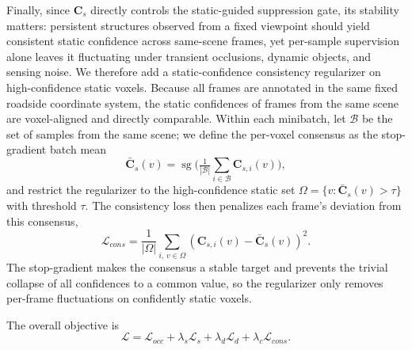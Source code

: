 Finally, since $\bm{C}_{s}$ directly controls the static-guided suppression
gate, its stability matters: persistent structures observed from a fixed
viewpoint should yield consistent static confidence across same-scene frames,
yet per-sample supervision alone leaves it fluctuating under transient
occlusions, dynamic objects, and sensing noise. We therefore add a
static-confidence consistency regularizer on high-confidence static voxels.
Because all frames are annotated in the same fixed roadside coordinate
system, the static confidences of frames from the same scene are voxel-aligned
and directly comparable. Within each minibatch, let $\mathcal{B}$ be the set of
samples from the same scene; we define the per-voxel consensus as the
stop-gradient batch mean
\begin{equation}
  \bar{\bm{C}}_{s}(v)
  =
  \operatorname{sg}\!\Big(
  \tfrac{1}{|\mathcal{B}|}\textstyle\sum_{i\in\mathcal{B}}\bm{C}_{s,i}(v)
  \Big),
\end{equation}
and restrict the regularizer to the high-confidence static set
$\Omega=\{v:\bar{\bm{C}}_{s}(v)>\tau\}$ with threshold $\tau$. The consistency
loss then penalizes each frame's deviation from this consensus,
\begin{equation}
  \mathcal{L}_{cons}
  =
  \frac{1}{|\Omega|}
  \sum_{i,\,v\in\Omega}
  \left(
  \bm{C}_{s,i}(v)-\bar{\bm{C}}_{s}(v)
  \right)^2 .
\end{equation}
The stop-gradient makes the consensus a stable target and prevents the
trivial collapse of all confidences to a common value, so the regularizer only
removes per-frame fluctuations on confidently static voxels.

The overall objective is
\begin{equation}
  \mathcal{L}
  =
  \mathcal{L}_{occ}
  +
  \lambda_s\mathcal{L}_{s}
  +
  \lambda_d\mathcal{L}_{d}
  +
  \lambda_c\mathcal{L}_{cons}.
\end{equation}

